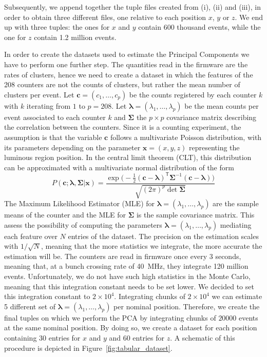 Subsequently, we append together the tuple files created from (i), (ii) and (iii), in order to obtain three different files, one relative to each position $x$, $y$ or $z$. We end up with three tuples: the ones for $x$ and $y$ contain 600 thousand events, while the one for $z$ contain 1.2 million events. 

In order to create the datasets used to estimate the Principal Components we have to perform one further step.
The quantities read in the firmware are the rates of clusters, hence we need to create a dataset in which the features of the 208 counters are not the counts of clusters, but rather the mean number of clusters per event. 
Let $\mathbf{c}=(c_1, \dots, c_p)$ be the counts registered by each counter $k$ with $k$ iterating from $1$ to $p=208$. Let $\mathbf{\lambda}=(\lambda_1, \dots, \lambda_p)$ be the mean counts per event associated to each counter $k$ and $\mathbf{\Sigma}$ the $p\times p$ covariance matrix describing the correlation between the counters. Since it is a counting experiment, the assumption is that the variable $\mathbf{c}$ follows a multivariate Poisson distribution, with its parameters depending on the parameter $\mathbf{x}=(x,y,z)$ representing the luminous region position. In the central limit theorem (CLT), this distribution can be approximated with a multivariate normal distribution of the form 
\begin{equation}
    P(\mathbf{c} ; \mathbf{\lambda},\mathbf{\Sigma} |\mathbf{x}) = \frac{\exp \bigl(-\frac{1}{2}(\mathbf{c}-\mathbf{\lambda})^{\mathsf{T}}\mathbf{\Sigma}^{-1}(\mathbf{c}-\mathbf{\lambda})\bigr)}{\sqrt{(2\pi)^p\det\mathbf{\Sigma}}}\label{mvgaussian}
\end{equation} 
The Maximum Likelihood Estimator (MLE) for  $\mathbf{\lambda}=(\lambda_1, \dots, \lambda_p)$ are the sample means of the counter and the MLE for $\mathbf{\Sigma}$ is the sample covariance matrix.
This assess the possibility of computing the parameters  $\mathbf{\lambda}=(\lambda_1, \dots, \lambda_p)$ mediating each feature over $N$ entries of the dataset. The precision on the estimation scales with $1/\sqrt{N}$, meaning that the more statistics we integrate, the more accurate the estimation will be. 
The counters are read in firmware once every $3$ seconds, meaning that, at a bunch crossing rate of \SI{40}{\mega\hertz}, they integrate 120 million events. Unfortunately, we do not have such high statistics in the Monte Carlo, meaning that this integration constant needs to be set lower. We decided to set this integration constant to $2\times10^4$. Integrating chunks of $2\times10^4$ we can estimate 5 different set of $\mathbf{\lambda}=(\lambda_1, \dots, \lambda_p)$ per nominal position. Therefore, we create the final tuples on which we perform the PCA by integrating chunks of $20000$ events at the same nominal position. By doing so, we create a dataset for each position containing 30 entries for $x$ and $y$ and 60 entries for $z$. A schematic of this procedure is depicted in Figure~\ref{fig:tabular_dataset}. 

